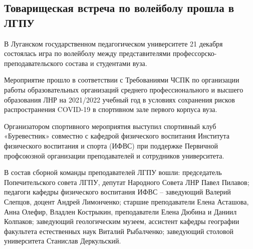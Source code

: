  
 
 
 
 
\subsection{Товарищеская встреча по волейболу прошла в ЛГПУ}
\label{sec:21_12_2021.stz.edu.lnr.lgpu.1.futbol}


В Луганском государственном педагогическом университете 21 декабря состоялась
игра по волейболу между представителями профессорско-преподавательского состава
и студентами вуза.


Мероприятие прошло в соответствии с Требованиями ЧСПК по организации работы
образовательных организаций среднего профессионального и высшего образования
ЛНР на 2021/2022 учебный год в условиях сохранения рисков распространения
COVID-19 в спортивном зале первого корпуса вуза.


Организатором спортивного мероприятия выступил спортивный клуб «Буревестник»
совместно с кафедрой физического воспитания Института физического воспитания и
спорта (ИФВС) при поддержке Первичной профсоюзной организации преподавателей и
сотрудников университета.


В состав сборной команды преподавателей ЛГПУ вошли: председатель
Попечительского совета ЛГПУ, депутат Народного Совета ЛНР Павел Пилавов;
педагоги кафедры физического воспитания ИФВС – заведующий Валерий Слепцов,
доцент Андрей Лимонченко; старшие преподаватели Елена Асташова, Анна Олефир,
Владлен Кострыкин, преподаватели Елена Дюбина и Даниил Колпаков; заведующий
геологическим музеем, ассистент кафедры географии факультета естественных наук
Виталий Рыбалченко; заведующий столовой университета Станислав Деркульский.

